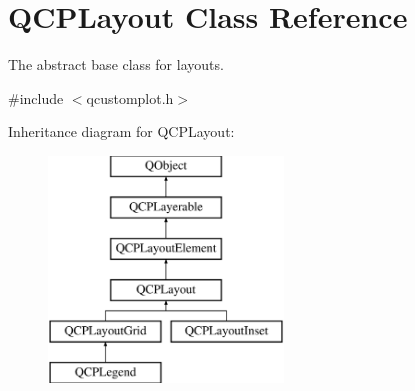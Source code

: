 \hypertarget{class_q_c_p_layout}{}\section{Q\+C\+P\+Layout Class Reference}
\label{class_q_c_p_layout}


The abstract base class for layouts.  




{\ttfamily \#include $<$qcustomplot.\+h$>$}

Inheritance diagram for Q\+C\+P\+Layout\+:\begin{figure}[H]
\begin{center}
\leavevmode
\includegraphics[height=6.000000cm]{de/d58/class_q_c_p_layout}
\end{center}
\end{figure}
